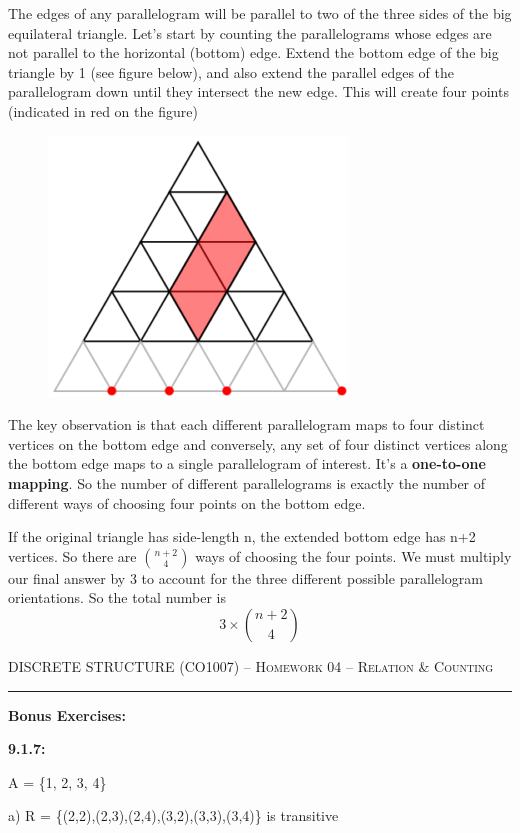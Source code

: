 \documentclass[12pt]{amsart}
\begin{document}
The edges of any parallelogram will be parallel to two of the three sides of the big equilateral triangle. Let’s start by counting the parallelograms whose edges are not parallel to the horizontal (bottom) edge. Extend the bottom edge of the big triangle by 1 (see figure below), and also extend the parallel edges of the parallelogram down until they intersect the new edge. This will create four points (indicated in red on the figure)
\begin{figure}[h]
    \includegraphics[scale=0.7]{problem_10.png}
\end{figure}
The key observation is that each different parallelogram maps to four distinct vertices on the bottom edge and conversely, any set of four distinct vertices along the bottom edge maps to a single parallelogram of interest. It’s a \textbf{one-to-one mapping}. So the number of different parallelograms is exactly the number of different ways of choosing four points on the bottom edge.

If the original triangle has side-length n, the extended bottom edge has n+2 vertices. So there are $\binom{n+2}{4}$ ways of choosing the four points. We must multiply our final answer by 3 to account for the three different possible parallelogram orientations.
So the total number is
\[3\times \binom{n+2}{4}\]
\newpage

{\scshape } \hfill {\scshape DISCRETE STRUCTURE (CO1007) -- Homework 04 -- Relation \& Counting} \hfill {\scshape }
 
\smallskip

\hrule

\bigskip

\bigskip
\textbf{Bonus Exercises: }

\textbf{9.1.7: }

A = \{1, 2, 3, 4\}

a) R = \{(2,2),(2,3),(2,4),(3,2),(3,3),(3,4)\} is transitive
\end{document}
